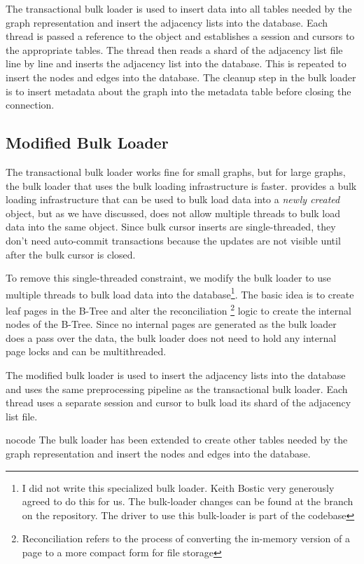The transactional bulk loader is used to insert data into all tables needed by the graph representation and insert the adjacency lists into the database.
Each thread is passed a reference to the  object and establishes a session and cursors to the appropriate tables. 
The thread then reads a shard of the adjacency list file line by line and inserts the adjacency list into the database.
This is repeated to insert the nodes and edges into the database.
The cleanup step in the bulk loader is to insert metadata about the graph into the metadata table before closing the connection.

\subsection{Modified \wt{} Bulk Loader}
The transactional bulk loader works fine for small graphs, but for large graphs, the bulk loader that uses the \wt{} bulk loading infrastructure is faster.
\wt{} provides a bulk loading infrastructure that can be used to bulk load data into a \emph{newly created} object, but as we have discussed, does not allow multiple threads to bulk load data into the same object.
Since bulk cursor inserts are single-threaded, they don't need auto-commit transactions because the updates are not visible until after the bulk cursor is closed.

To remove this single-threaded constraint, we modify the bulk loader to use multiple threads to bulk load data into the database\footnote{I did not write this specialized bulk loader. Keith Bostic very generously agreed to do this for us. The bulk-loader changes can be found at the  branch on the \wt{} repository. The driver to use this bulk-loader is part of the \project{} codebase}.
The basic idea is to create leaf pages in the B-Tree and alter the reconciliation \footnote{Reconciliation refers to the process of converting the in-memory version of a page to a more compact form for file storage} logic to create the internal nodes of the B-Tree.
Since no internal pages are generated as the bulk loader does a pass over the data, the bulk loader does not need to hold any internal page locks and can be multithreaded.

The modified bulk loader is used to insert the adjacency lists into the database and uses the same preprocessing pipeline as the transactional bulk loader.
Each thread uses a separate session and cursor to bulk load its shard of the adjacency list file. 
\begin{statusbar}{nocode}
The bulk loader has been extended to create other tables needed by the graph representation and insert the nodes and edges into the database.
\end{statusbar}

